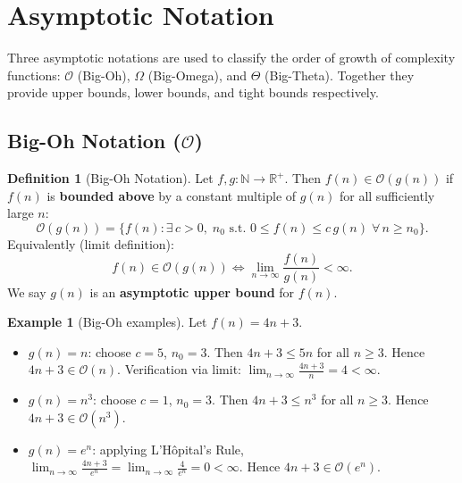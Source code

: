 \documentclass[11pt, a4paper, notitlepage]{report}
\theoremstyle{definition}
\newtheorem{definition}[theorem]{Definition}
\theoremstyle{remark}
\theoremstyle{definition}
\newtheorem{example}[theorem]{Example}
\begin{document}
\section{Asymptotic Notation}
\label{sec:asymptotic-notation}

Three asymptotic notations are used to classify the order of growth of
complexity functions: $\mathcal{O}$ (Big-Oh), $\Omega$ (Big-Omega), and
$\Theta$ (Big-Theta).  Together they provide upper bounds, lower bounds, and
tight bounds respectively.

\begin{center}
\end{center}

\subsection{Big-Oh Notation (\texorpdfstring{$\mathcal{O}$}{O})}
\label{subsec:big-oh}

\begin{definition}[Big-Oh Notation]
\label{def:big-oh}
Let $f, g : \mathbb{N} \to \mathbb{R}^+$.  Then $f(n) \in \mathcal{O}(g(n))$
if $f(n)$ is \textbf{bounded above} by a constant multiple of $g(n)$ for all
sufficiently large $n$:
\[
  \mathcal{O}(g(n)) = \bigl\{f(n) : \exists\, c > 0,\; n_0 \text{ s.t.\ }
  0 \le f(n) \le c\,g(n)\; \forall\, n \ge n_0\bigr\}.
\]
Equivalently (limit definition):
\[
  f(n) \in \mathcal{O}(g(n)) \iff \lim_{n\to\infty}\frac{f(n)}{g(n)} < \infty.
\]
We say $g(n)$ is an \textbf{asymptotic upper bound} for $f(n)$.
\end{definition}

\begin{example}[Big-Oh examples]
\label{ex:big-oh-examples}
Let $f(n) = 4n + 3$.
\begin{itemize}
  \item $g(n) = n$: choose $c = 5$, $n_0 = 3$.  Then $4n+3 \le 5n$ for all $n \ge 3$.
        Hence $4n + 3 \in \mathcal{O}(n)$.  Verification via limit:
        $\lim_{n\to\infty}\frac{4n+3}{n} = 4 < \infty$. \checkmark
  \item $g(n) = n^3$: choose $c = 1$, $n_0 = 3$.  Then $4n+3 \le n^3$ for all $n \ge 3$.
        Hence $4n + 3 \in \mathcal{O}(n^3)$. \checkmark
  \item $g(n) = e^n$: applying L'H\^{o}pital's Rule,
        $\lim_{n\to\infty}\frac{4n+3}{e^n} = \lim_{n\to\infty}\frac{4}{e^n} = 0 < \infty$.
        Hence $4n + 3 \in \mathcal{O}(e^n)$. \checkmark
\end{itemize}
\end{example}
\end{document}
